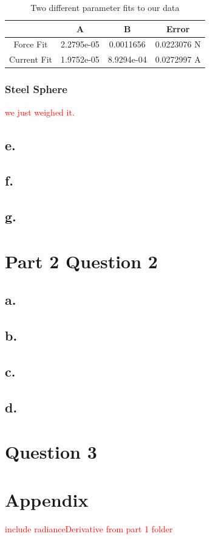 \documentclass{article}
\newcommand{\xxx}[1]{\textcolor{red}{#1}}
\theoremstyle{plain}
\theoremstyle{definition}
\theoremstyle{remark}
\begin{document}
\begin{table}
\begin{center}
    \begin{tabular}{|c|c|c|c|}
        \hline
        ~           & A          & B         &  Error \\ \hline
        Force Fit   & 2.2795e-05 & 0.0011656  & 0.0223076 N \\ 
        Current Fit & 1.9752e-05 & 8.9294e-04 & 0.0272997 A\\
        \hline
    \end{tabular}
\end{center}
\label{Q1_dt2}
\caption{Two different parameter fits to our data}
\end{table}

\subsubsection*{Steel Sphere}
\xxx{we just weighed it.}

\subsection*{e.}

\subsection*{f.}

\subsection*{g.}

\section*{Part 2 Question 2}

\subsection*{a.}

\subsection*{b.}

\subsection*{c.}

\subsection*{d.}

\section*{Question 3}

\section*{Appendix}
\xxx{include radianceDerivative from part 1 folder}
\end{document}
